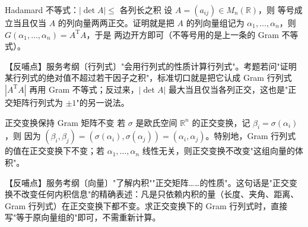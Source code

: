 \begin{fdeep}{Hadamard 不等式：$|\det A|\le$ 各列长之积}
设 $A=(a_{ij})\in M_{n}(\mathbb R)$，则
等号成立当且仅当 $A$ 的列向量两两正交。证明就是把 $A$ 的列向量组记为 $\alpha_{1},\dots,\alpha_{n}$，则 $G(\alpha_{1},\dots,\alpha_{n})=A^{\mathrm T}A$，于是
两边开方即可（不等号用的是上一条的 Gram 不等式）。

【反哺点】服务考纲〔行列式〕"会用行列式的性质计算行列式"。考题若问"证明某行列式的绝对值不超过若干因子之积"，标准切口就是把它认成 Gram 行列式 $|A^{\mathrm T}A|$ 再用 Gram 不等式；反过来，$|\det A|$ 最大当且仅当各列正交，这也是"正交矩阵行列式为 $\pm1$"的另一说法。
\end{fdeep}


\begin{fdeep}{正交变换保持 Gram 矩阵不变}
若 $\sigma$ 是欧氏空间 $\mathbb R^{n}$ 的正交变换，记 $\beta_{i}=\sigma(\alpha_{i})$，则
因为 $(\beta_{i},\beta_{j})=(\sigma(\alpha_{i}),\sigma(\alpha_{j}))=(\alpha_{i},\alpha_{j})$。特别地，Gram 行列式的值在正交变换下不变；若 $\alpha_{1},\dots,\alpha_{n}$ 线性无关，则正交变换不改变"这组向量的体积"。

【反哺点】服务考纲〔向量〕"了解内积""正交矩阵……的性质"。这句话是"正交变换不改变任何内积信息"的精确表述：凡是只依赖内积的量（长度、夹角、距离、Gram 行列式）在正交变换下都不变。求正交变换下的 Gram 行列式时，直接写"等于原向量组的"即可，不需重新计算。
\end{fdeep}


